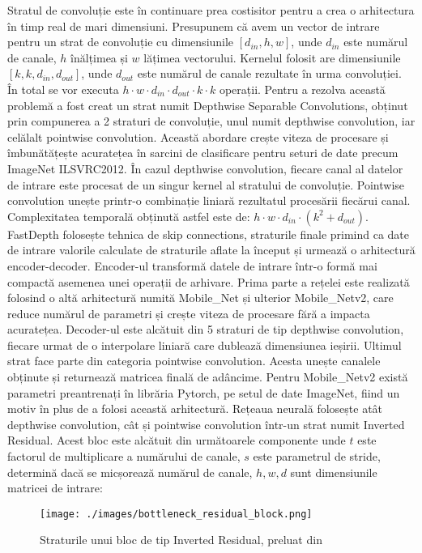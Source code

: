 \documentclass[12pt,a4paper]{report}
\begin{document}
Stratul de convoluție este în continuare prea costisitor pentru a crea o arhitectura în timp
real de mari dimensiuni. Presupunem că avem un vector de intrare pentru un strat de convoluție
cu dimensiunile \([d_{in}, h, w]\), unde \(d_{in}\) este numărul de canale,  \(h \) înălțimea și \(w\) lățimea vectorului.
Kernelul folosit are dimensiunile \([k, k, d_{in}, d_{out}]\),
unde \(d_{out}\) este numărul de canale rezultate în urma convoluției.
În total se vor executa $ h \cdot w \cdot d_{in} \cdot d_{out} \cdot k \cdot k$ operații.
Pentru  a rezolva această problemă a fost creat un strat numit Depthwise Separable Convolutions\cite{sifre2014rigidmotionscatteringtextureclassification}, 
obținut prin compunerea a 2 straturi de convoluție, unul numit depthwise convolution,
iar celălalt pointwise convolution. Această abordare crește viteza de procesare și îmbunătățește
acuratețea în sarcini de clasificare pentru seturi de date precum ImageNet ILSVRC2012. În cazul 
depthwise convolution, fiecare canal al datelor de intrare este procesat de un singur kernel
al stratului de convoluție. Pointwise convolution unește printr-o combinație liniară
rezultatul procesării fiecărui canal. Complexitatea temporală obținută astfel este de:
$ h \cdot w \cdot d_{in} \cdot (k^2 + d_{out})$\cite{fast}. \\ 

FastDepth folosește tehnica de skip connections, straturile finale primind ca date de intrare
valorile calculate de straturile aflate la început și urmează o arhitectură encoder-decoder. 
Encoder-ul transformă datele de intrare într-o formă mai compactă asemenea unei operații de arhivare.
Prima parte a rețelei este realizată folosind o altă arhitectură numită Mobile\_Net\cite{howard2017mobilenetsefficientconvolutionalneural} și 
ulterior Mobile\_Netv2\cite{sandler2019mobilenetv2invertedresidualslinear}, 
care reduce numărul de parametri și crește viteza de procesare fără a impacta acuratețea. 
Decoder-ul este alcătuit din 5 straturi de tip depthwise convolution, fiecare urmat de o 
interpolare liniară care dublează dimensiunea ieșirii. Ultimul strat face parte din categoria 
pointwise convolution. Acesta unește canalele obținute și returnează matricea finală de adâncime. Pentru
Mobile\_Netv2 există parametri preantrenați în librăria Pytorch\cite{paszke2017automatic}, pe setul de date ImageNet,
fiind un motiv în plus de a folosi această arhitectură. Rețeaua neurală folosește atât depthwise convolution,
cât și pointwise convolution într-un strat numit Inverted Residual. Acest bloc este alcătuit din următoarele 
componente unde $ t $ este factorul de multiplicare a numărului de canale, $ s $ este parametrul de stride, determină 
dacă se micșorează numărul de canale, $ h, w, d $ sunt dimensiunile matricei de intrare:
\begin{figure}[htbp] 
  \centering
  \texttt{[image: ./images/bottleneck\_residual\_block.png]}
  \caption{Straturile unui bloc de tip Inverted Residual, preluat din\cite{sandler2019mobilenetv2invertedresidualslinear}}\label{fig:bottleneck_residual_block}
\end{figure}
\end{document}
